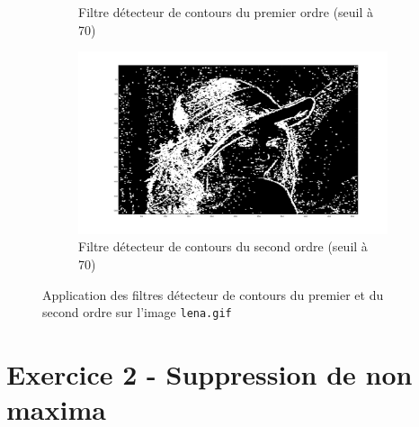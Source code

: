 \documentclass[a4paper]{article}
\begin{document}
\begin{enumerate}
\begin{figure}[H]
\begin{subfigure}[c]{0.3\textwidth}
        \caption{Filtre détecteur de contours du premier ordre (seuil à 70)}
    \label{subfig:lena-sobel}
    \end{subfigure}
    \hspace{0.5cm}
    \begin{subfigure}[c]{0.3\textwidth}
        \centering
        \includegraphics[width=1.5\textwidth]{images/lena_laplacien.png}
        \caption{Filtre détecteur de contours du second ordre (seuil à 70)}
    \label{subfig:lena-laplacien}
    \end{subfigure}

    \caption{Application des filtres détecteur de contours du premier et du
    second ordre sur l'image \texttt{lena.gif}}
    \label{fig:application-filtres}
\end{figure}

\end{enumerate}

\section*{Exercice 2 - Suppression de non maxima}
\end{document}
